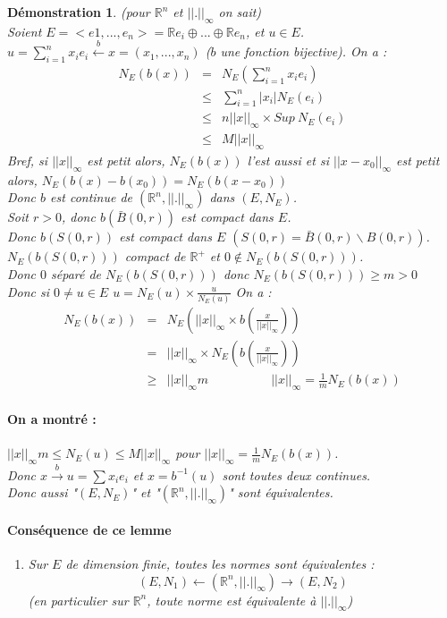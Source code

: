 \documentclass[a4paper, oneside]{report}
\theoremstyle{break}
\newtheorem*{demo}{Démonstration}
\newcommand{\x}{\times}
\newcommand{\R}{\mathbb{R}}
\newcommand{\fracun}[1]{\frac{1}{#1}}
\begin{document}
\begin{demo}
(pour $\R^n$ et $||.||_ \infty$ on sait)\\
Soient $E=<e1,...,e_n>=\R e_i \oplus ... \oplus \R e_n$, et $u\in E$.\\
$u = \sum_{i=1}^nx_ie_i \overset{b}{\leftarrow} x=(x_1,...,x_n)$ ($b$ une fonction bijective).
On a :
$$
\begin{array}{lll}
N_E(b(x))&=&N_E(\sum_{i=1}^nx_ie_i)\\
&\leq & \sum_{i=1}^n|x_i|N_E(e_i)\\
&\leq & n ||x||_\infty \x Sup~N_E(e_i)\\
&\leq & M ||x||_\infty
\end{array}$$
Bref, si $||x||_\infty$ est petit alors, $N_E(b(x))$ l'est aussi et si $||x-x_0||_\infty$ est petit alors, $N_E(b(x)-b(x_0)) = N_E(b(x - x_0))$\\
Donc $b$ est continue de $(\R^n, ||.||_\infty)$ dans $(E,N_E)$.\\
Soit $r>0$, donc $b(\bar{B}(0,r))$ est compact dans $E$.\\
Donc $b(S(0,r))$ est compact dans $E$ $(S(0,r) = \bar{B}(0,r)\backslash B(0,r))$.\\
$N_E(b(S(0,r)))$ compact de $\R^+$ et $0\notin N_E(b(S(0,r)))$.\\
Donc $0$ séparé de $N_E(b(S(0,r)))$ donc $N_E(b(S(0,r))) \geq m >0$\\
Donc si $0\neq u\in E$ $u=N_E(u)\x \frac{u}{N_E(u)}$
On a :
$$\begin{array}{lll}
N_E(b(x))&=&N_E(||x||_\infty\x b(\frac{x}{||x||_\infty}))\\
&=&||x||_\infty \x N_E(b(\frac{x}{||x||_\infty}))\\
&\geq& ||x||_\infty m\hspace{5em}||x||_\infty = \fracun{m}N_E(b(x))
\end{array}$$

\paragraph{On a montré :} 
$||x||_\infty m \leq N_E(u) \leq M ||x||_\infty$ pour $||x||_\infty = \fracun{m}N_E(b(x))$.\\
Donc $x\overset{b}{\rightarrow} u= \sum x_ie_i$ et $x = b^{-1}(u)$ sont toutes deux continues.\\
Donc aussi "$(E,N_E)$" et  "$(\R^n,||.||_\infty)$" sont équivalentes.\\

\paragraph{Conséquence de ce lemme}
\begin{enumerate}
\item Sur $E$ de dimension finie, toutes les normes sont équivalentes :
$$(E,N_1) \leftarrow (\R^n, ||.||_\infty) \rightarrow (E,N_2)$$
(en particulier sur $\R^n$, toute norme est équivalente à $||.||_\infty$)


\end{enumerate}
\end{demo}
\end{document}
